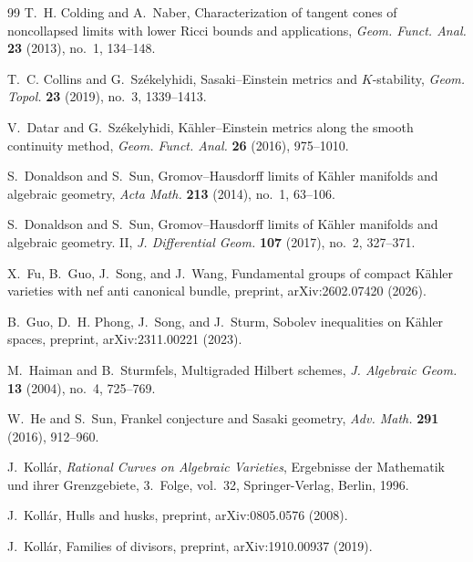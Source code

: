 \documentclass[11pt]{amsart}
\theoremstyle{definition}
\theoremstyle{remark}
\begin{document}
\begin{thebibliography}{99}
T.~H. Colding and A.~Naber,
\newblock Characterization of tangent cones of noncollapsed limits with
lower Ricci bounds and applications,
\newblock \emph{Geom. Funct. Anal.} \textbf{23} (2013), no.~1, 134--148.

T.~C. Collins and G.~Sz\'ekelyhidi,
\newblock Sasaki--Einstein metrics and $K$-stability,
\newblock \emph{Geom. Topol.} \textbf{23} (2019), no.~3, 1339--1413.

V.~Datar and G.~Sz\'ekelyhidi,
\newblock K\"ahler--Einstein metrics along the smooth continuity method,
\newblock \emph{Geom. Funct. Anal.} \textbf{26} (2016), 975--1010.

S.~Donaldson and S.~Sun,
\newblock Gromov--Hausdorff limits of K\"ahler manifolds and algebraic geometry,
\newblock \emph{Acta Math.} \textbf{213} (2014), no.~1, 63--106.

S.~Donaldson and S.~Sun,
\newblock Gromov--Hausdorff limits of K\"ahler manifolds and algebraic geometry. II,
\newblock \emph{J. Differential Geom.} \textbf{107} (2017), no.~2, 327--371.

X.~Fu, B.~Guo, J.~Song, and J.~Wang,
\newblock Fundamental groups of compact K\"ahler varieties with nef anti canonical bundle,
\newblock preprint, arXiv:2602.07420 (2026).

B.~Guo, D.~H. Phong, J.~Song, and J.~Sturm,
\newblock Sobolev inequalities on K\"ahler spaces,
\newblock preprint, arXiv:2311.00221 (2023).

M.~Haiman and B.~Sturmfels,
\newblock Multigraded Hilbert schemes,
\newblock \emph{J. Algebraic Geom.} \textbf{13} (2004), no.~4, 725--769.

W.~He and S.~Sun,
\newblock Frankel conjecture and Sasaki geometry,
\newblock \emph{Adv. Math.} \textbf{291} (2016), 912--960.

J.~Koll\'ar,
\newblock \emph{Rational Curves on Algebraic Varieties},
\newblock Ergebnisse der Mathematik und ihrer Grenzgebiete, 3.~Folge,
vol.~32, Springer-Verlag, Berlin, 1996.

J.~Koll\'ar,
\newblock Hulls and husks,
\newblock preprint, arXiv:0805.0576 (2008).

J.~Koll\'ar,
\newblock Families of divisors,
\newblock preprint, arXiv:1910.00937 (2019).


\end{thebibliography}
\end{document}
